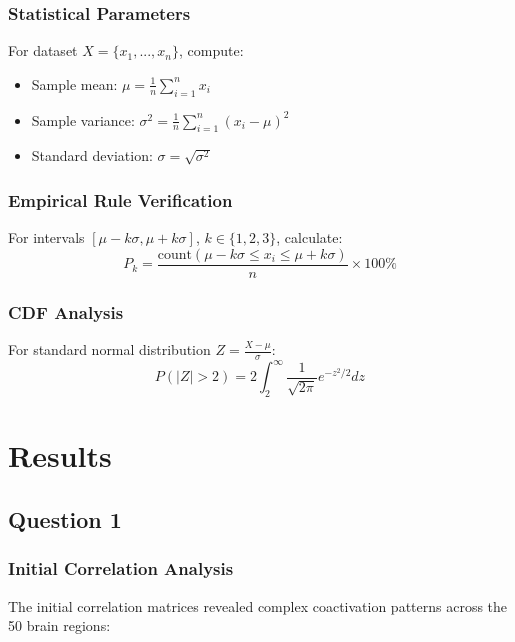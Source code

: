 \documentclass[12pt]{article}
\begin{document}
\subsubsection{Statistical Parameters}
For dataset $X = \{x_1, ..., x_n\}$, compute:
\begin{itemize}
    \item Sample mean: $\mu = \frac{1}{n}\sum_{i=1}^n x_i$
    \item Sample variance: $\sigma^2 = \frac{1}{n}\sum_{i=1}^n (x_i - \mu)^2$
    \item Standard deviation: $\sigma = \sqrt{\sigma^2}$
\end{itemize}

\subsubsection{Empirical Rule Verification}
For intervals $[\mu - k\sigma, \mu + k\sigma]$, $k \in \{1,2,3\}$, calculate:
\begin{equation}
    P_k = \frac{\text{count}(\mu - k\sigma \leq x_i \leq \mu + k\sigma)}{n} \times 100\%
\end{equation}

\subsubsection{CDF Analysis}
For standard normal distribution $Z = \frac{X-\mu}{\sigma}$:
\begin{equation}
    P(|Z| > 2) = 2\int_2^{\infty} \frac{1}{\sqrt{2\pi}} e^{-z^2/2} dz
\end{equation}

\section{Results}

\subsection{Question 1}
\subsubsection{Initial Correlation Analysis}
The initial correlation matrices revealed complex coactivation patterns across the 50 brain regions:
\end{document}
